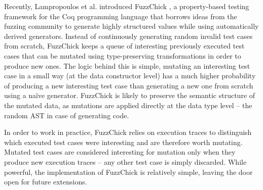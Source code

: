 \documentclass[10pt,conference]{IEEEtran}
\begin{document}

%
%

Recently, Lampropoulos et al. introduced FuzzChick
\cite{lampropoulos2019coverage}, a property-based testing framework for the Coq
programming language that borrows ideas from the fuzzing community to generate
highly structured values while using automatically derived generators.
%
Instead of continuously generating random invalid test cases from scratch,
FuzzChick keeps a queue of interesting previously executed test cases that can
be mutated using type-preserving transformations in order to produce new ones.
%
The logic behind this is simple, mutating an interesting test case in a
small way (at the data constructor level) has a much higher probability of
producing a new interesting test case than generating a new one from scratch
using a na\"ive generator.
%
FuzzChick is likely to preserve the semantic structure of the mutated data, as
mutations are applied directly at the data type level -- the random AST in case
of generating code.

In order to work in practice, FuzzChick relies on execution traces to
distinguish which executed test cases were interesting and are therefore worth
mutating.
%
%
Mutated test cases are considered interesting for mutation only when they
produce new execution traces -- any other test case is simply discarded.
%
%
%
While powerful, the implementation of FuzzChick is relatively simple, leaving
the door open for future extensions.
\end{document}
